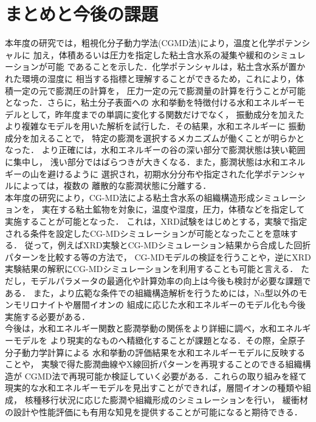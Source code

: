 ﻿\documentclass[11pt,a4j]{jarticle}
\begin{document}
\section{まとめと今後の課題}
本年度の研究では，粗視化分子動力学法(CGMD法)により，温度と化学ポテンシャルに
加え，体積あるいは圧力を指定した粘土含水系の凝集や緩和のシミュレーションが可能
であることを示した．化学ポテンシャルは，粘土含水系が置かれた環境の湿度に
相当する指標と理解することができるため，これにより，体積一定の元で膨潤圧の計算を，
圧力一定の元で膨潤量の計算を行うことが可能となった．さらに，粘土分子表面への
水和挙動を特徴付ける水和エネルギーモデルとして，昨年度までの単調に変化する関数だけでなく，
振動成分を加えたより複雑なモデルを用いた解析を試行した．その結果，水和エネルギーに
振動成分を加えることで， 特定の膨潤を選択するメカニズムが働くことが明らかとなった．
より正確には，水和エネルギーの谷の深い部分で膨潤状態は狭い範囲に集中し，
浅い部分ではばらつきが大きくなる．また，膨潤状態は水和エネルギーの山を避けるように
選択され，初期水分分布や指定された化学ポテンシャルによっては，複数の
離散的な膨潤状態に分離する．
\\
本年度の研究により，CG-MD法による粘土含水系の組織構造形成シミュレーションを，
実在する粘土鉱物を対象に，温度や湿度，圧力，体積などを指定して実施することが可能となった．
これは，XRD試験をはじめとする，実験で指定される条件を設定したCG-MDシミュレーションが可能となったことを意味する．
従って，例えばXRD実験とCG-MDシミュレーション結果から合成した回折パターンを比較する等の方法で，
CG-MDモデルの検証を行うことや，逆にXRD実験結果の解釈にCG-MDシミュレーションを利用することも可能と言える．
ただし，モデルパラメータの最適化や計算効率の向上は今後も検討が必要な課題である．
また，より広範な条件での組織構造解析を行うためには，Na型以外のモンモリロナイトや層間イオンの
組成に応じた水和エネルギーのモデル化も今後実施する必要がある．
\\
今後は，水和エネルギー関数と膨潤挙動の関係をより詳細に調べ，水和エネルギーモデルを
より現実的なものへ精緻化することが課題となる．その際，全原子分子動力学計算による
水和挙動の評価結果を水和エネルギーモデルに反映することや，
実験で得た膨潤曲線やX線回折パターンを再現することのできる組織構造が
CGMD法で再現可能か検証していく必要がある．これらの取り組みを経て
現実的な水和エネルギーモデルを見出すことができれば，層間イオンの種類や組成，
核種移行状況に応じた膨潤や組織形成のシミュレーションを行い，
緩衝材の設計や性能評価にも有用な知見を提供することが可能になると期待できる．
%
\end{document}

